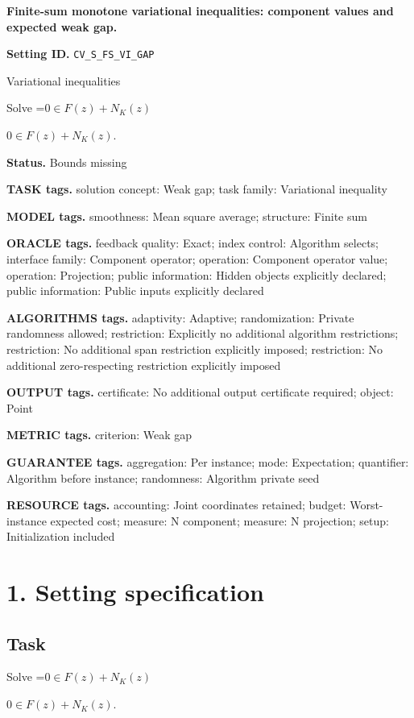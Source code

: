 \documentclass[10pt,a4paper]{article}
\newcommand{\AtlasMath}[1]{\par\begingroup\centering\setbox0=\hbox{$\displaystyle #1$}\ifdim\wd0>1.4\linewidth\typeout{ATLAS WIDE FORMULA: \the\wd0}\fi\ifdim\wd0>\linewidth\resizebox{\linewidth}{!}{\box0}\else\box0\fi\par\endgroup}
\newcommand{\AtlasInlineMath}[1]{\begingroup\setbox0=\hbox{$#1$}\ifdim\wd0>.4\linewidth\endgroup\AtlasMath{#1}\else\endgroup$#1$\fi}
\begin{document}
\raggedright

{\LARGE\bfseries\sffamily\color{AtlasNavy} Finite-sum monotone variational inequalities: component values and expected weak gap.\par}\vspace{5pt}
\textbf{Setting ID.} \texttt{CV\_\allowbreak{}S\_\allowbreak{}FS\_\allowbreak{}VI\_\allowbreak{}GAP}

Variational inequalities

Solve \AtlasInlineMath{0\in F(z)+N_K(z)}.

\textbf{Status.} Bounds missing

\textbf{TASK tags.} solution concept: Weak gap; task family: Variational inequality

\textbf{MODEL tags.} smoothness: Mean square average; structure: Finite sum

\textbf{ORACLE tags.} feedback quality: Exact; index control: Algorithm selects; interface family: Component operator; operation: Component operator value; operation: Projection; public information: Hidden objects explicitly declared; public information: Public inputs explicitly declared

\textbf{ALGORITHMS tags.} adaptivity: Adaptive; randomization: Private randomness allowed; restriction: Explicitly no additional algorithm restrictions; restriction: No additional span restriction explicitly imposed; restriction: No additional zero-respecting restriction explicitly imposed

\textbf{OUTPUT tags.} certificate: No additional output certificate required; object: Point

\textbf{METRIC tags.} criterion: Weak gap

\textbf{GUARANTEE tags.} aggregation: Per instance; mode: Expectation; quantifier: Algorithm before instance; randomness: Algorithm private seed

\textbf{RESOURCE tags.} accounting: Joint coordinates retained; budget: Worst-instance expected cost; measure: N component; measure: N projection; setup: Initialization included

\section{1. Setting specification}
\subsection{Task}
Solve \AtlasInlineMath{0\in F(z)+N_K(z)}.
\end{document}
